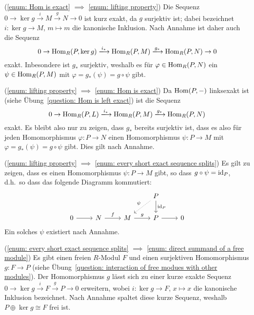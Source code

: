 \begin{solution}
  (\ref{enum: Hom is exact} $\implies$ \ref{enum: lifting property})
  Die Sequenz $0 \to \ker g \xrightarrow{i} M \xrightarrow{g} N \to 0$ ist kurz exakt, da $g$ surjektiv ist;
  dabei bezeichnet $i \colon \ker g \to M$, $m \mapsto m$ die kanonische Inklusion.
  Nach Annahme ist daher auch die Sequenz
  \[
                          0
    \to                   \Hom_R(P, \ker g)
    \xlongrightarrow{i_*} \Hom_R(P, M)
    \xlongrightarrow{g_*} \Hom_R(P, N)
    \to                   0
  \]
  exakt.
  Inbesondere ist $g_*$ surjektiv, weshalb es für $\varphi \in \operatorname{Hom}_R(P,N)$ ein $\psi \in \operatorname{Hom}_R(P,M)$ mit $\varphi = g_*(\psi) = g \circ \psi$ gibt.
  
  (\ref{enum: lifting property} $\implies$ \ref{enum: Hom is exact})
  Da $\operatorname{Hom}(P,-)$ linksexakt ist (siehe Übung~\ref{question: Hom is left exact}) ist die Sequenz
  \[
                          0
    \to                   \Hom_R(P, L)
    \xlongrightarrow{i_*} \Hom_R(P, M)
    \xlongrightarrow{g_*} \Hom_R(P, N)
  \]
  exakt.
  Es bleibt also nur zu zeigen, dass $g_*$ bereits surjektiv ist, dass es also für jeden Homomorphismus $\varphi \colon P \to N$ einen Homomorphismus $\psi \colon P \to M$ mit $\varphi = g_*(\psi) = g \circ \psi$ gibt.
  Dies gilt nach Annahme.
  
  (\ref{enum: lifting property} $\implies$ \ref{enum: every short exact sequence splits})
  Es gilt zu zeigen, dass es einen Homomorphismus $\psi \colon P \to M$ gibt, so dass $g \circ \psi = \operatorname{id}_P$, d.h.\ so dass das folgende Diagramm kommutiert:
  \[
    \begin{tikzcd}[ampersand replacement = \&]
        {}
    \&  {}
    \&  {}
    \&  P
        \arrow{d}{\id_P}
        \arrow[densely dotted, swap]{dl}{\psi}
    \&  {}
    \\
        0
        \arrow{r}
    \&  N
        \arrow{r}{f}
    \&  M
        \arrow{r}{g}
    \&  P
        \arrow{r}
    \&  0
    \end{tikzcd}
  \]
  Ein solches $\psi$ existiert nach Annahme.
  
  (\ref{enum: every short exact sequence splits} $\implies$ \ref{enum: direct summand of a free module})
  Es gibt einen freien $R$-Modul $F$ und einen surjektiven Homomorphismus $g \colon F \to P$ (siehe Übung~\ref{question: interaction of free modues with other modules}).
  Der Homomorphismus $g$ lässt sich zu einer kurze exakte Sequenz $0 \to \ker g \xrightarrow{i} F \xrightarrow{g} P \to 0$ erweitern, wobei $i \colon \ker g \to F$, $x \mapsto x$ die kanonische Inklusion bezeichnet.
  Nach Annahme spaltet diese kurze Sequenz, weshalb $P \oplus {\ker g} \cong F$ frei ist.
  

\end{solution}
